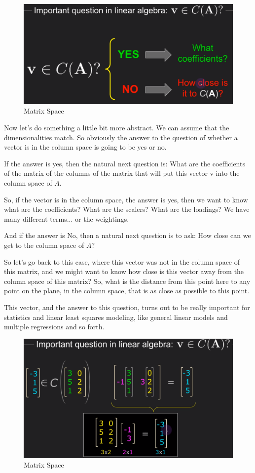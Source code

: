 \documentclass[fleqn,10pt]{olplainarticle}
\theoremstyle{definition}
\theoremstyle{remark}
\begin{document}
\begin{figure}[ht]
	\centering
	\includegraphics[width=0.5\linewidth]{images/matrix-space-07.png}
	\caption{Matrix Space}
	\label{fig:matrix_space_07}
\end{figure}

Now let's do something a little bit more abstract. We can assume that the dimensionalities match. So obviously the answer to the question of whether a vector is in the column space is going to be yes or no.

If the answer is yes, then the natural next question is: What are the coefficients of the matrix of the columns of the matrix that will put this vector v into the column space of $A$.

So, if the vector is in the column space, the answer is yes, then we want to know what are the coefficients? What are the scalers? What are the loadings? We have many different terms... or the weightings.

And if the answer is No, then a natural next question is to ask: How close can we get to the column space of $A$?

So let's go back to this case, where this vector was not in the column space of this matrix, and we might want to know how close is this vector away from the column space of this matrix? So, what is the distance from this point here to any point on the plane, in the column space, that is as close as possible to this point.

This vector, and the answer to this question, turns out to be really important for statistics and linear least squares modeling, like general linear models and multiple regressions and so forth.

\begin{figure}[ht]
	\centering
	\includegraphics[width=0.5\linewidth]{images/matrix-space-08.png}
	\caption{Matrix Space}
	\label{fig:matrix_space_08}
\end{figure}
\end{document}

